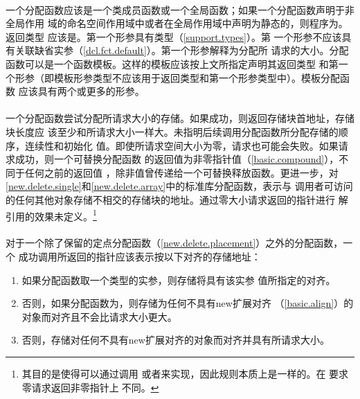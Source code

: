 \paragraph{} %
一个分配函数应该是一个类成员函数或一个全局函数；如果一个分配函数声明于非全局作用
域的命名空间作用域中或者在全局作用域中声明为静态的，则程序为\illform{}。返回类型
应该是。第一个形参具有类型（\ref{support.types}）。第
一个形参不应该具有关联缺省实参（\ref{dcl.fct.default}）。第一个形参解释为分配所
请求的大小。分配函数可以是一个函数模板。这样的模板应该按上文所指定声明其返回类型
和第一个形参（即模板形参类型不应该用于返回类型和第一个形参类型中）。模板分配函数
应该具有两个或更多的形参。

\paragraph{} %
一个分配函数尝试分配所请求大小的存储。如果成功，则返回存储块首地址，存储块长度应
该至少和所请求大小一样大。未指明后续调用分配函数所分配存储的顺序，连续性和初始化
值。即使所请求空间大小为零，请求也可能会失败。如果请求成功，则一个可替换分配函数
的返回值为非零指针值（\ref{basic.compound}），不同于任何之前的返回值
，除非值曾传递给一个可替换释放函数。更进一步，对
\ref{new.delete.single}和\ref{new.delete.array}中的标准库分配函数，表示与
调用者可访问的任何其他对象存储不相交的存储块的地址。通过零大小请求返回的指针进行
解引用的效果未定义。\footnote{其目的是使得可以通过调用
或者来实现，因此规则本质上是一样的。\cpp{}在
要求零请求返回非零指针上与\c{}不同。}

\paragraph{} %
对于一个除了保留的定点分配函数（\ref{new.delete.placement}）之外的分配函数，一个
成功调用所返回的指针应该表示按以下对齐的存储地址：
\begin{enumerate}
  \item 如果分配函数取一个类型的实参，则存储将具有该实参
        值所指定的对齐。
  \item 否则，如果分配函数为，则存储为任何不具有new扩展对齐
        （\ref{basic.align}）的对象而对齐且不会比请求大小更大。
  \item 否则，存储对任何不具有new扩展对齐的对象而对齐并具有所请求大小。
\end{enumerate}

